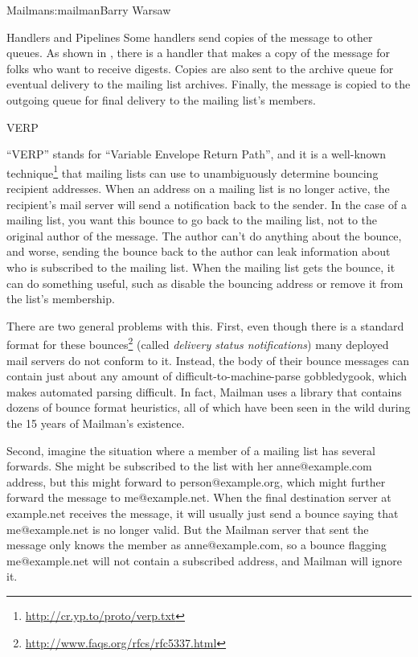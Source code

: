 \begin{aosachapter}{Mailman}{s:mailman}{Barry Warsaw}
\begin{aosasect1}{Handlers and Pipelines}
Some handlers send copies of the message to other queues.  As shown in
, there is a handler that makes a
copy of the message for folks who want to receive digests.  Copies are
also sent to the archive queue for eventual delivery to the mailing
list archives.  Finally, the message is copied to the outgoing queue
for final delivery to the mailing list's members.

\end{aosasect1}

\begin{aosasect1}{VERP}

``VERP'' stands for ``Variable Envelope Return Path'', and it is a
well-known technique\footnote{\url{http://cr.yp.to/proto/verp.txt}}
that mailing lists can use to unambiguously determine bouncing
recipient addresses.  When an address on a mailing list is no longer
active, the recipient's mail server will send a notification back to
the sender.  In the case of a mailing list, you want this bounce to go
back to the mailing list, not to the original author of the message.
The author can't do anything about the bounce, and worse, sending the
bounce back to the author can leak information about who is subscribed
to the mailing list.  When the mailing list gets the bounce, it can do
something useful, such as disable the bouncing address or remove it
from the list's membership.

There are two general problems with this.  First, even though there is
a standard format for these
bounces\footnote{\url{http://www.faqs.org/rfcs/rfc5337.html}} (called
\emph{delivery status notifications}) many deployed mail servers do
not conform to it.  Instead, the body of their bounce messages can
contain just about any amount of difficult-to-machine-parse
gobbledygook, which makes automated parsing difficult.  In fact,
Mailman uses a library that contains dozens of bounce format
heuristics, all of which have been seen in the wild during the 15
years of Mailman's existence.

Second, imagine the situation where a member of a mailing list has
several forwards.  She might be subscribed to the list with her
anne@example.com address, but this might forward to
person@example.org, which might further forward the message to
me@example.net.  When the final destination server at example.net
receives the message, it will usually just send a bounce saying that
me@example.net is no longer valid.  But the Mailman server that sent
the message only knows the member as anne@example.com, so a bounce
flagging me@example.net will not contain a subscribed address, and
Mailman will ignore it.


\end{aosasect1}
\end{aosachapter}
